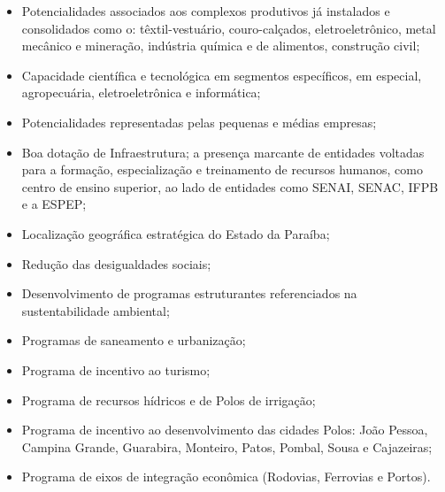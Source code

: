 \begin{itemize}
  \item Potencialidades associados aos complexos produtivos já instalados e consolidados como o: têxtil-vestuário, couro-calçados, eletroeletrônico, metal mecânico e mineração, indústria química e de alimentos, construção civil;
  \item Capacidade científica e tecnológica em segmentos específicos, em especial, agropecuária, eletroeletrônica e informática;
  \item Potencialidades representadas pelas pequenas e médias empresas;
  \item Boa dotação de Infraestrutura; a presença marcante de entidades voltadas para a formação, especialização e treinamento de recursos humanos, como centro de ensino superior, ao lado de entidades como SENAI, SENAC, IFPB e a ESPEP;
  \item Localização geográfica estratégica do Estado da Paraíba;
  \item Redução das desigualdades sociais;
  \item Desenvolvimento de programas estruturantes referenciados na sustentabilidade ambiental;
  \item Programas de saneamento e urbanização;
  \item Programa de incentivo ao turismo;
  \item Programa de recursos hídricos e de Polos de irrigação;
  \item Programa de incentivo ao desenvolvimento das cidades Polos: João Pessoa, Campina Grande, Guarabira, Monteiro, Patos, Pombal, Sousa e Cajazeiras;
  \item Programa de eixos de integração econômica (Rodovias, Ferrovias e Portos).
\end{itemize}


